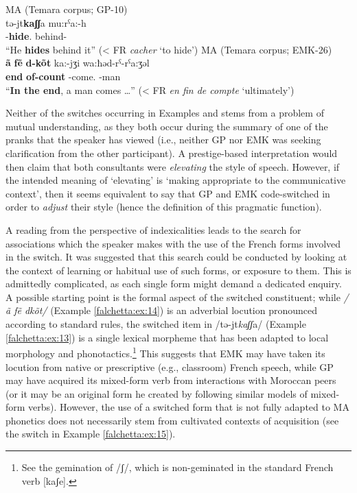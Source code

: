 \documentclass[output=paper]{langscibook}
\begin{document}
\begin{exe}
	\ex\label{falchetta:ex:13} \gls*{MA} (Temara corpus; GP-10) \\
	\gll tǝ-jt\textbf{kaʃʃ}a   mu:rˁa:-h \\
	\PRVB-\textbf{hide}.\Third\M\SG{} behind-\Third\M\SG{} \\
	\glt “He \textbf{hides} behind it” (< FR \textit{cacher} ‘to hide’)\footnotemark
	\ex\label{falchetta:ex:14} \gls*{MA} (Temara corpus; EMK-26) \\
	\gll \textbf{ã} \textbf{fẽ} \textbf{d-kõt} ka:-jʒi   wa:ħǝd-rˁ-rˁa:ʒǝl \\
	\textbf{\PREP} \textbf{end} \textbf{of-count} \PRVB-come.\Third\M\SG{} \INDF-man \\
	\glt “\textbf{In the end}, a man comes \dots” (< FR \textit{en fin de compte} ‘ultimately’)
\end{exe}


Neither of the switches occurring in Examples  and   stems from a problem of mutual understanding, as they both occur during the summary of one of the pranks that the speaker has viewed (i.e., neither GP nor EMK was seeking clarification from the other participant). A prestige-based interpretation would then claim that both consultants were \textit{elevating} the style of speech. However, if the intended meaning of ‘elevating' is ‘making appropriate to the communicative context', then it seems equivalent to say that GP and EMK code-switched in order to \textit{adjust} their style (hence the definition of this pragmatic function). 

A reading from the perspective of indexicalities leads to the search for associations which the speaker makes with the use of the French forms involved in the switch. It was suggested that this search could be conducted by looking at the context of learning or habitual use of such forms, or exposure to them. This is admittedly complicated, as each single form might demand a dedicated enquiry. A possible starting point is the formal aspect of the switched constituent; while \textit{/ã fẽ dkõt/} (Example  \ref{falchetta:ex:14}) is an adverbial locution pronounced according to standard rules, the switched item in /tǝ-jt\textit{kaʃʃ}a/ (Example \ref{falchetta:ex:13}) is a single lexical morpheme that has been adapted to local morphology and phonotactics.\footnote{See the gemination of /ʃ/, which is non-geminated in the standard French verb [kaʃe].} This suggests that EMK may have taken its locution from native or prescriptive (e.g., classroom) French speech, while GP may have acquired its mixed-form verb from interactions with Moroccan peers (or it may be an original form he created by following similar models of mixed-form verbs). However, the use of a switched form that is not fully adapted to \gls*{MA} phonetics does not necessarily stem from cultivated contexts of acquisition (see the switch in Example \ref{falchetta:ex:15}). 
\end{document}
